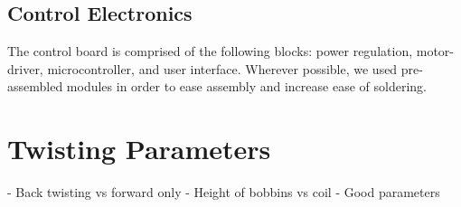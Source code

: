 \documentclass[11pt,a4paper]{article}
\begin{document}
\subsection{Control Electronics}
The control board is comprised of the following blocks: power regulation,
motor-driver, microcontroller, and user interface. Wherever possible, we used
pre-assembled modules in order to ease assembly and increase ease of soldering.



\section{Twisting Parameters}
- Back twisting vs forward only
- Height of bobbins vs coil
- Good parameters

\medskip


\end{document}
